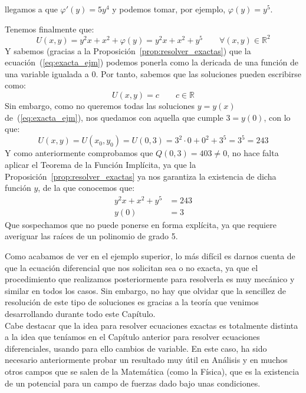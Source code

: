 \begin{ejemplo}
    llegamos a que $\varphi'(y) = 5y^4$ y podemos tomar, por ejemplo, $\varphi(y)=y^5$.

    Tenemos finalmente que:
    \begin{equation*}
        U(x,y) = y^2x+x^2+\varphi(y)= y^2x+x^2+y^5 \qquad \forall (x,y)\in \mathbb{R}^2
    \end{equation*}
    Y sabemos (gracias a la Proposición~\ref{prop:resolver_exactas}) que la ecuación~(\ref{eq:exacta_ejm}) podemos ponerla como la dericada de una función de una variable igualada a 0. Por tanto, sabemos que las soluciones pueden escribirse como:
    \begin{equation*}
        U(x,y) = c  \qquad c\in \mathbb{R}
    \end{equation*}
    Sin embargo, como no queremos todas las soluciones $y=y(x)$ de~(\ref{eq:exacta_ejm}), nos quedamos con aquella que cumple $3=y(0)$, con lo que:
    \begin{equation*}
        U(x,y) = U(x_0,y_0) = U(0,3) = 3^2\cdot 0 + 0^2 + 3^5 = 3^5 = 243
    \end{equation*}
    Y como anteriormente comprobamos que $Q(0,3) = 403 \neq 0$, no hace falta aplicar el Teorema de la Función Implícita, ya que la Proposición~\ref{prop:resolver_exactas} ya nos garantiza la existencia de dicha función $y$, de la que conocemos que:
    \begin{align*}
            y^2x + x^2 + y^5 &= 243 \\
            y(0) &= 3
    \end{align*}
    Que sospechamos que no puede ponerse en forma explícita, ya que requiere averiguar las raíces de un polinomio de grado 5.
\end{ejemplo}
Como acabamos de ver en el ejemplo superior, lo más difícil es darnos cuenta de que la ecuación diferencial que nos solicitan sea o no exacta, ya que el procedimiento que realizamos posteriormente para resolverla es muy mecánico y similar en todos los casos. Sin embargo, no hay que olvidar que la sencillez de resolución de este tipo de soluciones es gracias a la teoría que venimos desarrollando durante todo este Capítulo.\\

Cabe destacar que la idea para resolver ecuaciones exactas es totalmente distinta a la idea que teníamos en el Capítulo anterior para resolver ecuaciones diferenciales, usando para ello cambios de variable. En este caso, ha sido necesario anteriormente probar un resultado muy útil en Análisis y en muchos otros campos que se salen de la Matemática (como la Física), que es la existencia de un potencial para un campo de fuerzas dado bajo unas condiciones.

